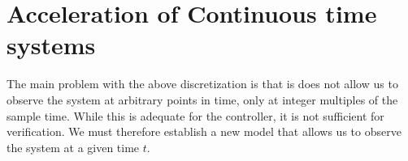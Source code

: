 \documentclass[sigconf]{llncs}
\begin{document}
 \section{Acceleration of Continuous time systems}\label{sec:continuous_time_accel}
 The main problem with the above discretization is that is does not allow us to observe the system at arbitrary points in time, only at integer multiples of the sample time. While this is adequate for the controller, it is not sufficient for verification. We must therefore establish a new model that allows us to observe the system at a given time $t$.
 
\end{document}
